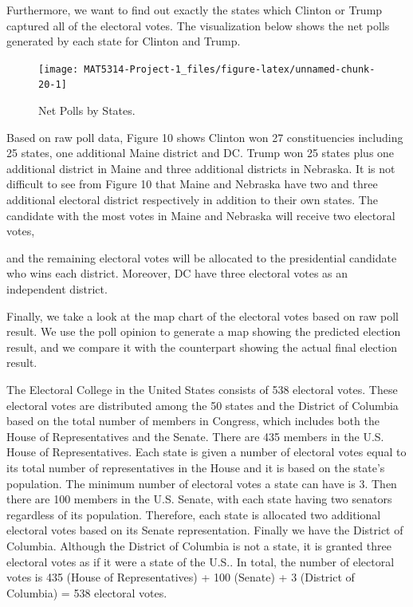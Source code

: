 \documentclass[
  12pt,
]{article}
\begin{document}
Furthermore, we want to find out exactly the states which Clinton or
Trump captured all of the electoral votes. The visualization below shows
the net polls generated by each state for Clinton and Trump.

\begin{minipage}[t]{0.7\textwidth}
\begin{figure}
\texttt{[image: MAT5314-Project-1\_files/figure-latex/unnamed-chunk-20-1]} \caption{Net Polls by States.}\label{fig:unnamed-chunk-20}
\end{figure}
\end{minipage}
\begin{minipage}[t]{0.3\textwidth}
\vspace{0pt}
Based on raw poll data, Figure 10 shows Clinton won 27 constituencies including 25 states, one additional Maine district and DC. Trump won 25 states plus one additional district in Maine and three additional districts in Nebraska. It is not difficult to see from Figure 10 that Maine and Nebraska have two and three additional electoral district respectively in addition to their own states. The candidate with the most votes in Maine and Nebraska will receive two electoral votes,
\end{minipage}

and the remaining electoral votes will be allocated to the presidential
candidate who wins each district. Moreover, DC have three electoral
votes as an independent district.

Finally, we take a look at the map chart of the electoral votes based on
raw poll result. We use the poll opinion to generate a map showing the
predicted election result, and we compare it with the counterpart
showing the actual final election result.

The Electoral College in the United States consists of 538 electoral
votes. These electoral votes are distributed among the 50 states and the
District of Columbia based on the total number of members in Congress,
which includes both the House of Representatives and the Senate. There
are 435 members in the U.S. House of Representatives. Each state is
given a number of electoral votes equal to its total number of
representatives in the House and it is based on the state's population.
The minimum number of electoral votes a state can have is 3. Then there
are 100 members in the U.S. Senate, with each state having two senators
regardless of its population. Therefore, each state is allocated two
additional electoral votes based on its Senate representation. Finally
we have the District of Columbia. Although the District of Columbia is
not a state, it is granted three electoral votes as if it were a state
of the U.S.. In total, the number of electoral votes is 435 (House of
Representatives) + 100 (Senate) + 3 (District of Columbia) = 538
electoral votes.
\end{document}
